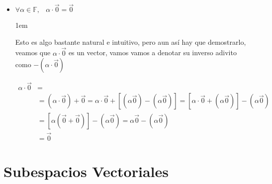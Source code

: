 \documentclass[12pt, fleqn]{report}                             %
\newenvironment{SmallIndentation}[1][0.75em]                    %
    {\begin{adjustwidth}{#1}{}\begin{footnotesize}}                 %
    {\end{footnotesize}\end{adjustwidth}}                           %
\DeclareMathOperator \Space {\quad}                             %
\DeclareMathOperator \MiniSpace {\;}                            %
\begin{document}
\begin{itemize}
\begin{SmallIndentation}[1em]
                    \end{SmallIndentation}


                \item $\forall \alpha \in \mathbb{F}, \MiniSpace \alpha \cdot \vec{0} = \vec{0}$

                    \begin{SmallIndentation}[1em]
                        Esto es algo bastante natural e intuitivo, pero aun así hay que demostrarlo, 
                        veamos que $\alpha \cdot \vec{0}$ es un vector, vamos vamos a denotar su inverso
                        adivito como $- (\alpha \cdot \vec{0})$

                        \begin{equation*}
                        \begin{split}
                            \alpha \cdot \vec{0} &=                                                           \\
                                            &= (\alpha \cdot \vec{0}) + \vec{0} 
                                             = \alpha \cdot \vec{0} + [ (\alpha \vec{0}) - (\alpha \vec{0}) ]
                                             = [\alpha \cdot \vec{0} +  (\alpha \vec{0})] - (\alpha \vec{0})  \\
                                            &= [\alpha (\vec{0} + \vec{0})] - (\alpha \vec{0})                 
                                             = \alpha \vec{0} - (\alpha \vec{0})                              \\
                                            &= \vec{0}
                        \end{split}
                        \end{equation*}

                    \end{SmallIndentation}

            \end{itemize}


    \chapter{Subespacios Vectoriales}
\end{document}
